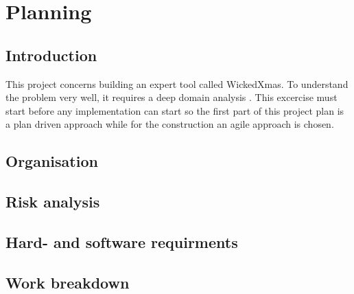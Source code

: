 
\section{Planning}

\subsection{Introduction}
This project concerns building an expert tool called WickedXmas. To understand the problem very well, it requires a deep domain analysis . This excercise must start before any implementation can start so the first part of this project plan is a plan driven approach while for the construction an agile approach is chosen. 

\subsection{Organisation}

\subsection{Risk analysis}

\subsection{Hard- and software requirments}

\subsection{Work breakdown}

